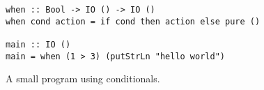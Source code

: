 \begin{verbatim}
when :: Bool -> IO () -> IO ()
when cond action = if cond then action else pure ()

main :: IO ()
main = when (1 > 3) (putStrLn "hello world")
\end{verbatim}
\caption{A small program using conditionals.}
